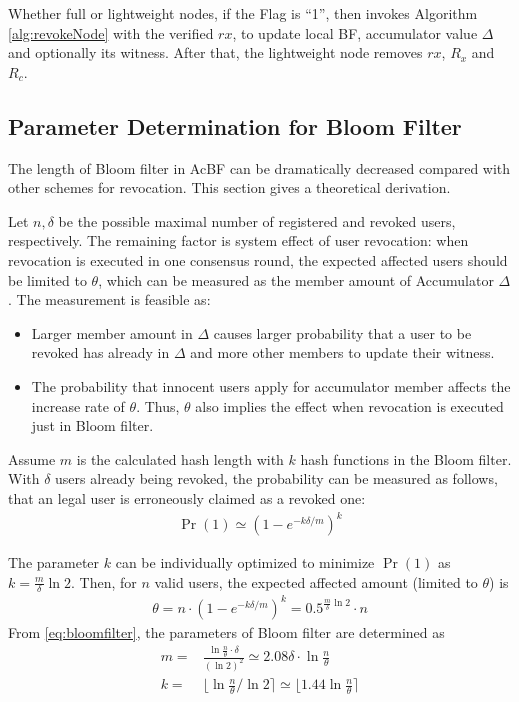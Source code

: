 \documentclass[conference]{IEEEtran}
\begin{document}
Whether full or lightweight nodes, if the Flag is ``1'', then invokes Algorithm \ref{alg:revokeNode} with the verified $rx$, to update local BF, accumulator value $\Delta$ and optionally its witness.
After that, the lightweight node removes $rx$, $R_x$ and $R_c$.

\subsection{Parameter Determination for Bloom Filter} \label{section:parameter}

The length of Bloom filter in AcBF can be dramatically decreased compared with other schemes for revocation. This section gives a theoretical derivation.

Let $n, \delta$ be the possible maximal number of registered and revoked users, respectively. The remaining factor is system effect of user revocation: when revocation is executed in one consensus round, the expected affected users should be limited to $\theta$, which can be measured as the member amount of Accumulator $\Delta$. The measurement is feasible as:
\begin{itemize}
    \item Larger member amount in $\Delta$ causes larger probability that a user to be revoked has already in $\Delta$ and more other members to update their witness.
    \item The probability that innocent users apply for accumulator member affects the increase rate of $\theta$. Thus, $\theta$ also implies the effect when revocation is executed just in Bloom filter.
\end{itemize}

Assume $m$ is the calculated hash length with $k$ hash functions in the Bloom filter. With $\delta$ users already being revoked, the probability can be measured as follows, that an legal user is erroneously claimed as a revoked one: 
\begin{align} 
    \Pr(1) \simeq (1 - e^{-k\delta/m})^k 
 \end{align}

The parameter $k$ can be individually optimized to minimize $\Pr(1)$ as $ k = \frac{m}{\delta}\ln 2$. Then, for $n$ valid users, the expected affected amount (limited to $\theta$) is 
\begin{align}\label{eq:bloomfilter}
    \theta = n \cdot (1 - e^{-k\delta/m})^{k} = 0.5^{\frac{m}{\delta}\ln 2}\cdot n
\end{align}
From \eqref{eq:bloomfilter}, the parameters of Bloom filter are determined as 
\begin{align}
m = & \frac{\ln \frac{n}{\theta} \cdot \delta}{(\ln 2)^2} \simeq 2.08\delta \cdot\ln \frac{n}{\theta}\\
k = & \lfloor \ln \frac{n}{\theta} / \ln 2 \rceil \simeq \lfloor 1.44 \ln \frac{n}{\theta} \rceil
\end{align}
\end{document}
